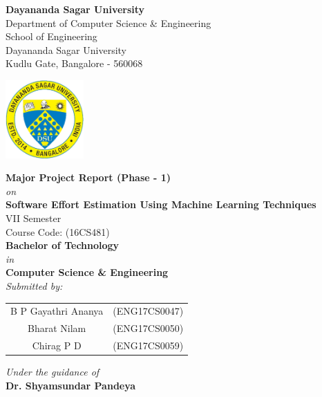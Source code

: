 \documentclass[a4paper,12pt]{article}
\date{}
\begin{document}
\begin{titlepage}
    \begin{center}
        
        \Large
        \textbf{Dayananda Sagar University \\}
        \large
        Department of Computer Science \& Engineering \\
        School of Engineering \\
        Dayananda Sagar University \\
        Kudlu Gate, Bangalore - 560068
        
        \vspace{0.7cm}
        \includegraphics[width=3cm]{dsu logo cropped.jpg}
        
        \vspace{0.7cm}
        \Large
        \textbf{Major Project Report (Phase - 1) \\}
        \large
        \textit{on \\}
        \Large
        \textbf{Software Effort Estimation Using Machine Learning Techniques \\}
        \vfill
        \large
        VII Semester \\
        Course Code: (16CS481) \\
        \vspace{0.7cm}
        \textbf{Bachelor of Technology \\}
        \textit{in \\}
        \textbf{Computer Science \& Engineering \\}
        \vspace{0.7cm}
        \textit{Submitted by: \\}
        \vspace{0.5cm}
        \begin{tabular}{c c}
            B P Gayathri Ananya & (ENG17CS0047) \\
            Bharat Nilam & (ENG17CS0050) \\
            Chirag P D & (ENG17CS0059)
        \end{tabular}
        \vfill
        
        \textit{Under the guidance of \\}
        \textbf{Dr. Shyamsundar Pandeya}
        
    \end{center}
\end{titlepage}
\end{document}
